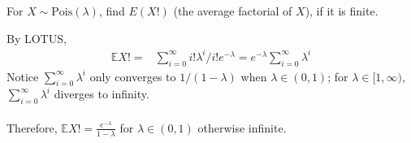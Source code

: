 
\setcounter{theorem}{60}
\begin{exercise} [BH.4.61] For $X \sim \text{Pois}(\lambda)$, find $E(X!)$ (the average factorial of $X$), if it is finite.
\begin{solution}
    By LOTUS, 
	\begin{align*}
		\mathbb{E}X! = & \sum_{i=0}^\infty i! \lambda^i /i! e^{-\lambda} =e^{-\lambda} \sum_{i=0}^\infty \lambda^i  
	\end{align*}
	Notice $\sum_{i=0}^\infty \lambda^i $ only converges to $ 1/(1-\lambda)$ when $\lambda\in (0,1)$; for $\lambda\in [1,\infty)$, $\sum_{i=0}^\infty \lambda^i $ diverges to infinity.  \\~\\
	Therefore, $\mathbb{E}X! =\frac{e^{-\lambda}}{1-\lambda}$ for $\lambda\in (0,1)$ otherwise infinite.
\end{solution}
\end{exercise}

